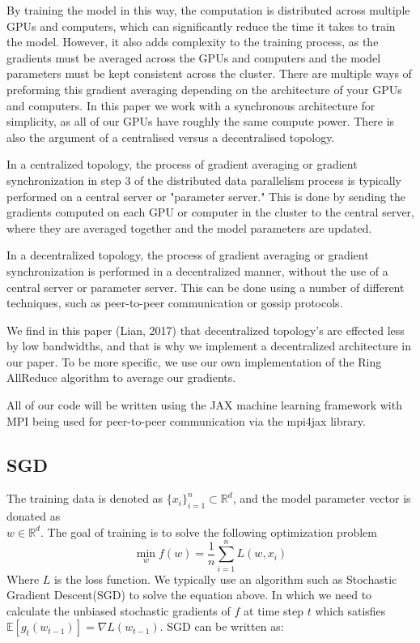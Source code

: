 \documentclass[twocolumn,10pt]{article}
\begin{document}
By training the model in this way, the computation is distributed across multiple GPUs and computers, which can significantly reduce the time it takes to train the model. However, it also adds complexity to the training process, as the gradients must be averaged across the GPUs and computers and the model parameters must be kept consistent across the cluster. There are multiple ways of preforming this gradient averaging depending on the architecture of your GPUs and computers. In this paper we work with a synchronous architecture for simplicity, as all of our GPUs have roughly the same compute power. There is also the argument of a centralised versus a decentralised topology.

In a centralized topology, the process of gradient averaging or gradient synchronization in step 3 of the distributed data parallelism process is typically performed on a central server or "parameter server." This is done by sending the gradients computed on each GPU or computer in the cluster to the central server, where they are averaged together and the model parameters are updated.

In a decentralized topology, the process of gradient averaging or gradient synchronization is performed in a decentralized manner, without the use of a central server or parameter server. This can be done using a number of different techniques, such as peer-to-peer communication or gossip protocols.

We find in this paper (Lian, 2017)\cite{lian2017can} that decentralized topology's are effected less by low bandwidths, and that is why we implement a decentralized architecture in our paper. To be more specific, we use our own implementation of the Ring AllReduce algorithm \cite{gibiansky2017bringing} to average our gradients. 

All of our code will be written using the JAX \cite{jax2018github} machine learning framework with MPI being used for peer-to-peer communication via the mpi4jax \cite{mpi4jax} library.

\subsection{SGD}

The training data is denoted as $\{x_i\}^n_{i=1} \subset \mathbb{R}^d$, and the model parameter vector is donated as\\ $w \in \mathbb{R}^d$. The goal of training is to solve the following optimization problem 
$$
\min_w f
(w) = \frac{1}{n} \sum^n_{i=1}L(w,x_i)
$$
Where $L$ is the loss function. We typically use an algorithm such as Stochastic Gradient Descent(SGD) to solve the equation above. In which we need to calculate the unbiased stochastic gradients of $f$ at time step $t$ which satisfies $\mathbb{E}[g_t(w_{t-1})] = {\nabla} L(w_{t-1})$. SGD can be written as:
\end{document}
